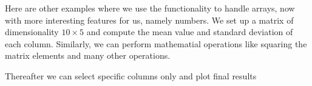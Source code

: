 \documentclass[letterpaper,10pt,english]{sphinxmanual}
\begin{document}
Here are other examples where we use the  functionality to handle arrays, now with more interesting features for us, namely numbers. We set up a matrix
of dimensionality \(10\times 5\) and compute the mean value and standard deviation of each column. Similarly, we can perform mathematial operations like squaring the matrix elements and many other operations.

\begin{sphinxVerbatim}[commandchars=\\\{\}]
   
   
   
  
  
  
  
\end{sphinxVerbatim}

Thereafter we can select specific columns only and plot final results
\end{document}
